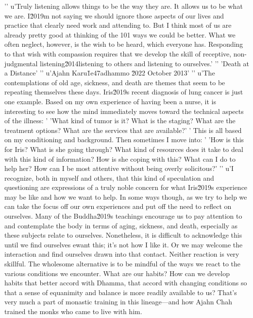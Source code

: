 {'\n'
u'Truly listening allows things to be the way they are. It allows us to be what we are. I\u2019m not saying we should ignore those aspects of our lives and practice that clearly need work and attending to. But I think most of us are already pretty good at thinking of the 101 ways we could be better. What we often neglect, however, is the wish to be heard, which everyone has. Responding to that wish with compassion requires that we develop the skill of receptive, non-judgmental listening\u2014listening to others and listening to ourselves.'
'\n'
'Death at a Distance'
'\n'
u'Ajahn Karu\u1e47adhammo \u2022 October 2013'
'\n'
u'The contemplations of old age, sickness, and death are themes that seem to be repeating themselves these days. Iris\u2019s recent diagnosis of lung cancer is just one example. Based on my own experience of having been a nurse, it is interesting to see how the mind immediately moves toward the technical aspects of the illness: '
'What kind of tumor is it? What is the staging? What are the treatment options? What are the services that are available?'
' This is all based on my conditioning and background. Then sometimes I move into: '
'How is this for Iris? What is she going through? What kind of resources does it take to deal with this kind of information? How is she coping with this? What can I do to help her? How can I be most attentive without being overly solicitous?'
'\n'
u'I recognize, both in myself and others, that this kind of speculation and questioning are expressions of a truly noble concern for what Iris\u2019s experience may be like and how we want to help. In some ways though, as we try to help we can take the focus off our own experiences and put off the need to reflect on ourselves. Many of the Buddha\u2019s teachings encourage us to pay attention to and contemplate the body in terms of aging, sickness, and death, especially as these subjects relate to ourselves. Nonetheless, it is difficult to acknowledge this until we find ourselves ewant this; it's not how I like it.} 
Or we may welcome the interaction and find ourselves drawn into that 
contact. Neither reaction is very skillful. The wholesome alternative 
is to be mindful of the ways we react to the various conditions we 
encounter. What are our habits? How can we develop habits that better 
accord with Dhamma, that accord with changing conditions so that a 
sense of equanimity and balance is more readily available to us? That's 
very much a part of monastic training in this lineage---and how Ajahn 
Chah trained the monks who came to live with him.

